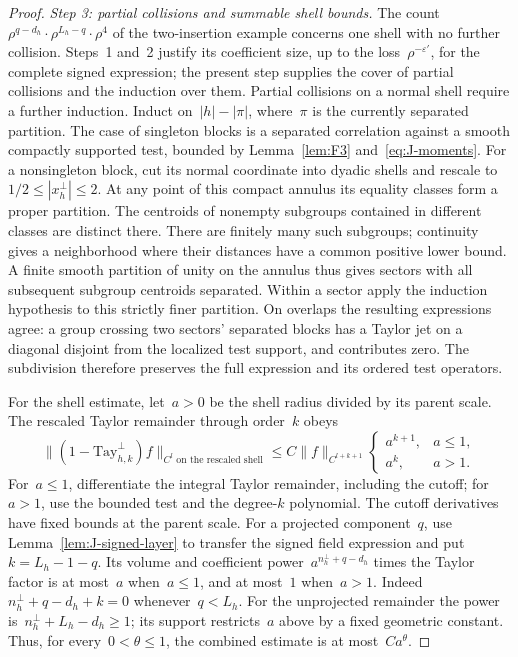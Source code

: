 \begin{proof}
\emph{Step 3: partial collisions and summable shell bounds.} The count $\rho^{q-d_h}\cdot\rho^{L_h-q}\cdot\rho^4$ of the two-insertion example concerns one shell with no further collision. Steps~1 and~2 justify its coefficient size, up to the loss~$\rho^{-\varepsilon'}$, for the complete signed expression; the present step supplies the cover of partial collisions and the induction over them. Partial collisions on a normal shell require a further induction. Induct on~$|h|-|\pi|$, where~$\pi$ is the currently separated partition. The case of singleton blocks is a separated correlation against a smooth compactly supported test, bounded by Lemma~\ref{lem:F3} and~\eqref{eq:J-moments}. For a nonsingleton block, cut its normal coordinate into dyadic shells and rescale to~$1/2\le|x_h^\perp|\le2$. At any point of this compact annulus its equality classes form a proper partition. The centroids of nonempty subgroups contained in different classes are distinct there. There are finitely many such subgroups; continuity gives a neighborhood where their distances have a common positive lower bound. A finite smooth partition of unity on the annulus thus gives sectors with all subsequent subgroup centroids separated. Within a sector apply the induction hypothesis to this strictly finer partition. On overlaps the resulting expressions agree: a group crossing two sectors' separated blocks has a Taylor jet on a diagonal disjoint from the localized test support, and contributes zero. The subdivision therefore preserves the full expression and its ordered test operators.

For the shell estimate, let~$a>0$ be the shell radius divided by its parent scale. The rescaled Taylor remainder through order~$k$ obeys
\begin{equation}\label{eq:J-shell-Taylor}
\|(1-\mathrm{Tay}_{h,k}^{\perp})f\|_{C^l\text{ on the rescaled shell}}
\le C\|f\|_{C^{l+k+1}}
\begin{cases}a^{k+1},&a\le1,\\a^k,&a>1.\end{cases}
\end{equation}
For~$a\le1$, differentiate the integral Taylor remainder, including the cutoff; for~$a>1$, use the bounded test and the degree-$k$ polynomial. The cutoff derivatives have fixed bounds at the parent scale. For a projected component~$q$, use Lemma~\ref{lem:J-signed-layer} to transfer the signed field expression and put~$k=L_h-1-q$. Its volume and coefficient power~$a^{n^\perp_h+q-d_h}$ times the Taylor factor is at most~$a$ when~$a\le1$, and at most~$1$ when~$a>1$. Indeed~$n^\perp_h+q-d_h+k=0$ whenever~$q<L_h$. For the unprojected remainder the power is~$n^\perp_h+L_h-d_h\ge1$; its support restricts~$a$ above by a fixed geometric constant. Thus, for every~$0<\theta\le1$, the combined estimate is at most~$C a^\theta$.


\end{proof}

